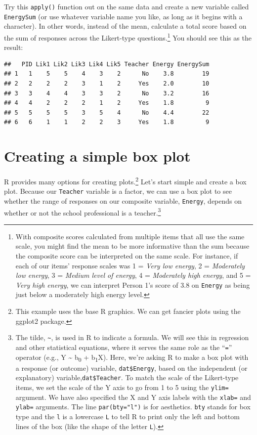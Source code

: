 \documentclass[
]{article}
\begin{document}
Try this \texttt{apply()} function out on the same data and create a new variable called \texttt{EnergySum} (or use whatever variable name you like, as long as it begins with a character). In other words, instead of the mean, calculate a total score based on the sum of responses across the Likert-type questions.\footnote{With composite scores calculated from multiple items that all use the same scale, you might find the mean to be more informative than the sum because the composite score can be interpreted on the same scale.
  For instance, if each of our items' response scales was 1 = \emph{Very low energy}, 2 = \emph{Moderately low energy}, 3 = \emph{Medium level of energy}, 4 = \emph{Moderately high energy}, and 5 = \emph{Very high energy}, we can interpret Person 1's score of 3.8 on \texttt{Energy} as being just below a moderately high energy level.} You should see this as the result:

\begin{verbatim}
##   PID Lik1 Lik2 Lik3 Lik4 Lik5 Teacher Energy EnergySum
## 1   1    5    5    4    3    2      No    3.8        19
## 2   2    2    2    3    1    2     Yes    2.0        10
## 3   3    4    4    3    3    2      No    3.2        16
## 4   4    2    2    2    1    2     Yes    1.8         9
## 5   5    5    5    3    5    4      No    4.4        22
## 6   6    1    1    2    2    3     Yes    1.8         9
\end{verbatim}

\hypertarget{plotting}{%
\section{Creating a simple box plot}\label{plotting}}

R provides many options for creating plots.\footnote{This example uses the base R graphics. We can get fancier plots using the ggplot2 package.} Let's start simple and create a box plot. Because our \texttt{Teacher} variable is a factor, we can use a box plot to see whether the range of responses on our composite variable, \texttt{Energy}, depends on whether or not the school professional is a teacher.\footnote{The tilde, \texttt{\textasciitilde{}}, is used in R to indicate a formula. We will see this in regression and other statistical equations, where it serves the same role as the ``\texttt{=}'' operator (e.g., Y \textasciitilde{} b\textsubscript{0} + b\textsubscript{1}X). Here, we're asking R to make a box plot with a response (or outcome) variable, \texttt{dat\$Energy}, based on the independent (or explanatory) variable,\texttt{dat\$Teacher}. To match the scale of the Likert-type items, we set the scale of the Y axis to go from 1 to 5 using the \texttt{ylim=} argument. We have also specified the X and Y axis labels with the \texttt{xlab=} and \texttt{ylab=} arguments. The line \texttt{par(bty="l")} is for aesthetics. \texttt{bty} stands for box type and the \texttt{l} is a lowercase \texttt{L} to tell R to print only the left and bottom lines of the box (like the shape of the letter \texttt{L}).}
\end{document}
